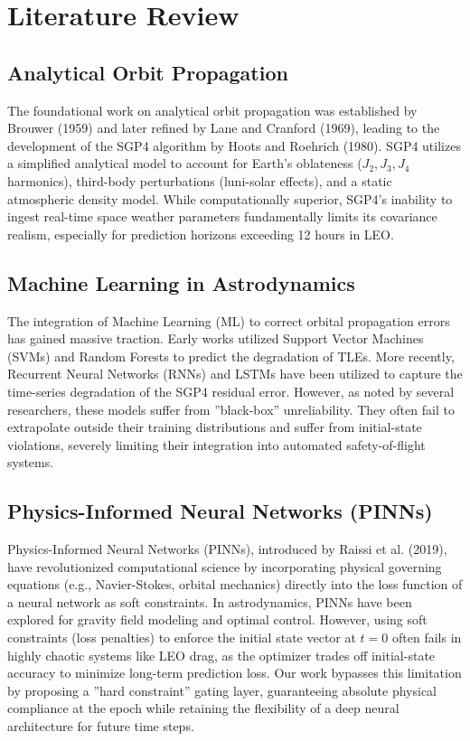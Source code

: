 \section{Literature Review}

\subsection{Analytical Orbit Propagation}
The foundational work on analytical orbit propagation was established by Brouwer (1959) and later refined by Lane and Cranford (1969), leading to the development of the SGP4 algorithm by Hoots and Roehrich (1980). SGP4 utilizes a simplified analytical model to account for Earth's oblateness ($J_2, J_3, J_4$ harmonics), third-body perturbations (luni-solar effects), and a static atmospheric density model. While computationally superior, SGP4's inability to ingest real-time space weather parameters fundamentally limits its covariance realism, especially for prediction horizons exceeding 12 hours in LEO.

\subsection{Machine Learning in Astrodynamics}
The integration of Machine Learning (ML) to correct orbital propagation errors has gained massive traction. Early works utilized Support Vector Machines (SVMs) and Random Forests to predict the degradation of TLEs. More recently, Recurrent Neural Networks (RNNs) and LSTMs have been utilized to capture the time-series degradation of the SGP4 residual error. However, as noted by several researchers, these models suffer from ''black-box'' unreliability. They often fail to extrapolate outside their training distributions and suffer from initial-state violations, severely limiting their integration into automated safety-of-flight systems.

\subsection{Physics-Informed Neural Networks (PINNs)}
Physics-Informed Neural Networks (PINNs), introduced by Raissi et al. (2019), have revolutionized computational science by incorporating physical governing equations (e.g., Navier-Stokes, orbital mechanics) directly into the loss function of a neural network as soft constraints. In astrodynamics, PINNs have been explored for gravity field modeling and optimal control. However, using soft constraints (loss penalties) to enforce the initial state vector at $t=0$ often fails in highly chaotic systems like LEO drag, as the optimizer trades off initial-state accuracy to minimize long-term prediction loss. Our work bypasses this limitation by proposing a ''hard constraint'' gating layer, guaranteeing absolute physical compliance at the epoch while retaining the flexibility of a deep neural architecture for future time steps.


